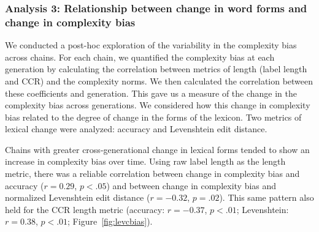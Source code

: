 
  
\subsubsection{Analysis  3: Relationship between change in word forms and change in complexity bias} 


We  conducted a post-hoc exploration of the variability in the complexity bias across chains. For each chain, we quantified the complexity bias at each generation by calculating the correlation between metrics of length (label length and CCR) and the complexity norms. We then calculated the correlation between these coefficients and generation. This gave us a measure of the change in the complexity bias across generations. We considered how this change in complexity bias related to the degree of change in the forms of the lexicon. Two metrics of lexical change were analyzed: accuracy and Levenshtein edit distance. 

Chains with greater cross-generational change in lexical forms tended to show an increase in complexity bias over time. Using raw label length as the length metric, there was a reliable correlation between change in complexity bias and accuracy ($r=0.29$, $p <.05$) and between  change in complexity bias  and normalized Levenshtein edit distance ($r=-0.32$, $p =.02$). This same pattern also held for the CCR length metric (accuracy: $r=-0.37$, $p <.01$; Levenshtein: $r=0.38$, $p <.01$; Figure\ \ref{fig:levcbias}).


